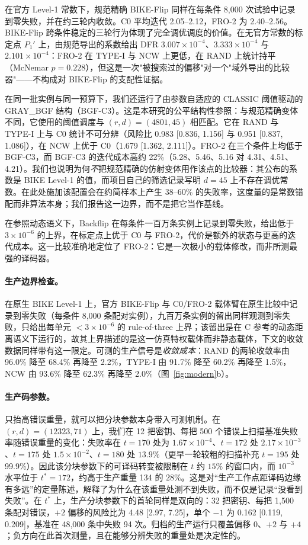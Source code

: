\documentclass[UTF8,a4paper,10pt,twocolumn]{ctexart}
\begin{document}
在官方 Level-1 常数下，规范精确 BIKE-Flip 同样在每条件 8{,}000 次试验中记录到零失败，并在约三轮内收敛。C0 平均迭代 2.05--2.12，FRO-2 为 2.40--2.56。BIKE-Flip 跨条件稳定的三轮行为体现了完全调优调度的价值。在无官方常数的标定点 $P_1'$ 上，由规范导出的系数给出 DFR $3.007\times10^{-4}$、$3.333\times10^{-4}$ 与 $2.101\times10^{-4}$：FRO-2 在 TYPE-I 与 NCW 上更低，在 RAND 上统计持平（McNemar $p=0.228$），但这是一次"被搜索过的偏移"对一个"域外导出的比较器"——不构成对 BIKE-Flip 的支配性证据。

在同一批实例与同一预算下，我们还运行了由参数自适应的 CLASSIC 阈值驱动的 GRAY\_BGF 结构（BGF-C3）。这是本研究的公平结构性参照：与规范精确变体不同，它使用的阈值调度与 $(r,d)=(4801,45)$ 相匹配。它在 RAND 与 TYPE-I 上与 C0 统计不可分辨（风险比 0.983 [0.836, 1.156] 与 0.951 [0.837, 1.086]），在 NCW 上优于 C0（1.679 [1.362, 2.111]）。FRO-2 在三个条件上均低于 BGF-C3，而 BGF-C3 的迭代成本高约 22\%（5.28、5.46、5.16 对 4.31、4.51、4.21）。我们也说明为何\emph{不}把规范精确的仿射变体用作该点的比较器：其公布的系数是 BIKE Level-1 的值，而项目自己的筛选记录写明 $d=45$ 上不存在调优常数。在此处施加该配置会在约简样本上产生 38--60\% 的失败率，这度量的是常数错配而非算法本身；我们报告这一边界，而不是把它当作基线。

在参照动态语义下，Backflip 在每条件一百万条实例上记录到零失败，给出低于 $3\times10^{-6}$ 的上界，在标定点上优于 C0 与 FRO-2，代价是额外的状态与更高的迭代成本。这一比较准确地定位了 FRO-2：它是一次极小的载体修改，而非所测最强的译码器。

\paragraph{生产边界检查。} 在原生 BIKE Level-1 上，官方 BIKE-Flip 与 C0/FRO-2 载体臂在原生比较中记录到零失败（每条件 8{,}000 条配对实例），九百万条实例的留出同样观测到零失败，只给出每单元 $<3\times10^{-6}$ 的 rule-of-three 上界；该留出是在 C 参考的动态距离语义下运行的，故其上界描述的是这一仿真特权载体而非静态载体，下文的收敛数据同样带有这一限定。可测的生产信号是\emph{收敛成本}：RAND 的两轮收敛率由 96.0\% 降至 68.4\% 再降至 2.2\%，TYPE-I 由 91.7\% 降至 60.2\% 再降至 1.5\%，NCW 由 93.6\% 降至 62.3\% 再降至 2.0\%（图~\ref{fig:modern}b）。

\paragraph{生产码参数。} 只抬高错误重量，就可以把分块参数本身带入可测机制。在 $(r,d)=(12323,71)$ 上，我们在 12 把密钥、每把 500 个错误上扫描基准失败率随错误重量的变化：失败率在 $t=170$ 处为 $1.67\times10^{-4}$、$t=172$ 处 $2.17\times10^{-3}$、$t=175$ 处 $1.5\times10^{-2}$、$t=180$ 处 $13.9\%$（更早一轮较粗的扫描补充 $t=195$ 处 99.9\%）。因此该分块参数下的可译码转变被限制在 $t$ 约 $15\%$ 的窗口内，而 $10^{-3}$ 水平位于 $t^{\ast}=172$，约高于生产重量 134 的 $28\%$。这是对“生产工作点距译码边缘有多远”的定量陈述，解释了为什么在该重量处测不到失败，而不仅是记录“没看到失败”。在 $t^{\ast}$ 上，生产分块参数下的首轮同样是双向的：32 把密钥、每把 1{,}500 条配对错误，$+2$ 偏移的风险比为 4.48 [2.97, 7.25]，单个 $-1$ 为 0.162 [0.119, 0.209]，基准在 48{,}000 条中失败 94 次。归档的生产运行只覆盖偏移 $0$、$+2$ 与 $+4$；负方向在此首次测量，且在能够分辨失败的重量处是决定性的。
\end{document}
